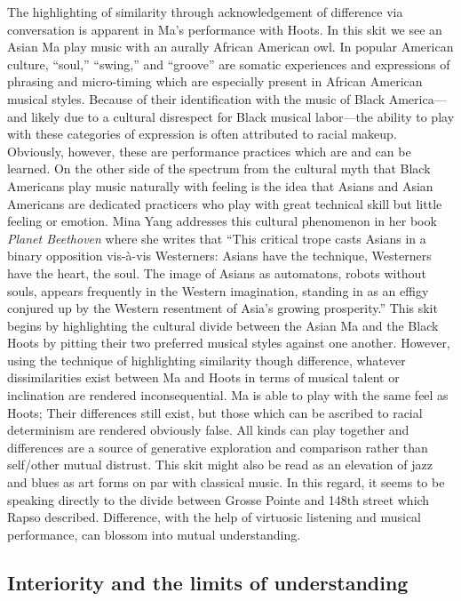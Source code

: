 \documentclass[12pt,letterpaper]{article}
\begin{document}
	The highlighting of similarity through acknowledgement of difference 
	via conversation is apparent in Ma's 
	performance with Hoots. In this skit we see an Asian Ma play music with 
	an aurally 
	African American owl. In popular American culture, ``soul,'' 
	``swing,'' and ``groove'' are somatic experiences and expressions of 
	phrasing and micro-timing which are especially present in African 
	American musical styles. Because of their identification with the music
	of Black America---and likely due to a cultural disrespect for Black 
	musical labor---the ability to play with these categories of expression
	is often attributed to racial makeup. Obviously, however, these are 
	performance practices which are and can be learned. On the other side 
	of the spectrum from the 
	cultural myth that Black Americans play music naturally with feeling is
	the idea that Asians and Asian Americans are dedicated practicers who 
	play with great technical skill but little feeling or emotion. Mina Yang
	addresses this cultural phenomenon in her book \textit{Planet Beethoven}
	where she writes that ``This critical trope casts Asians in a binary 
	opposition vis-à-vis Westerners: Asians have the technique, Westerners 
	have the heart, the soul. The image of Asians as automatons, robots 
	without souls, appears frequently in the Western imagination, standing 
	in as an effigy conjured up by the Western resentment of Asia’s growing
	prosperity.''\autocite[79]{Yang} This skit begins by highlighting the 
	cultural divide between the Asian Ma and the Black Hoots by pitting 
	their two preferred musical styles against one another. However, using 
	the technique of highlighting similarity though difference, whatever 
	dissimilarities exist between Ma and Hoots in terms of musical talent or
	inclination are rendered inconsequential. Ma is able to play with the 
	same feel as Hoots; Their differences still exist, but those which can 
	be ascribed to racial determinism are rendered obviously false. All 
	kinds can play together and differences are a source of generative 
	exploration and comparison rather than self/other mutual distrust. This
	skit might also be read as an elevation of jazz and blues as art forms 
	on par with classical music. In this regard, it seems to be speaking 
	directly to the divide between Grosse Pointe and 148th street which 
	Rapso described. Difference, with the help of virtuosic listening and 
	musical performance, can blossom into mutual understanding.


	\subsection*{Interiority and the limits of understanding}
\end{document}
